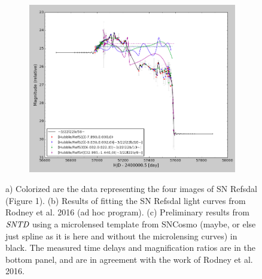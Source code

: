 \begin{figure}
\begin{subfigure}{.3\textwidth}
\includegraphics[width=\linewidth]{supcos.png}
\caption{}\label{fig:fig_c}
\end{subfigure}
\caption{
a) Colorized are the data representing the four images of SN Refsdal
(Figure 1). (b) Results of fitting the SN Refsdal light curves from
Rodney et al. 2016 (ad hoc program). (c) Preliminary results from
$\textit{SNTD}$ using a microlensed template from SNCosmo (maybe, or
else just spline as it is here and without the microlensing curves) in
black. The measured time delays and magnification ratios are in the
bottom panel, and are in agreement with the work of Rodney et
al. 2016.}
\end{figure}

